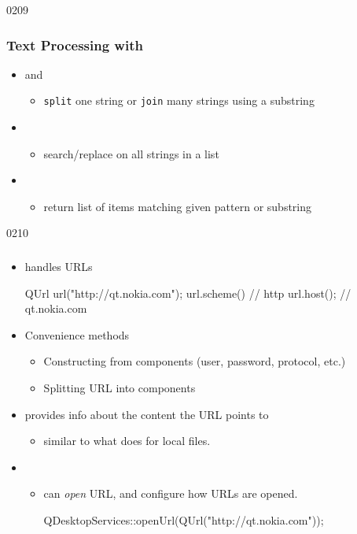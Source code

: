 \begin{slide}{0209}\frametitle{Text Processing with }
\begin{itemize}
\item {} and 
\begin{itemize}
  \item \texttt{split} one string or \texttt{join} many strings using a substring
\end{itemize} 
\item {} 
  \begin{itemize}
    \item search/replace on all strings in a list
  \end{itemize} 
  \item {} 
    \begin{itemize}
      \item return list of items matching given pattern or substring
    \end{itemize} 
\end{itemize}
\end{slide}

\begin{slide}[fragile]{0210}\frametitle{}
\begin{itemize}
\item {} handles URLs
\begin{cpp}
QUrl url("http://qt.nokia.com");
url.scheme()  // http
url.host();   // qt.nokia.com
\end{cpp}

\item Convenience methods 
\begin{itemize}
  \item Constructing from components (user, password, protocol, etc.)
  \item Splitting URL into components
\end{itemize}
\item {} provides info about the content the URL points to
  \begin{itemize}
  	\item similar to what  does for local files.
  \end{itemize}  
  \item {}
  \begin{itemize}  
  	\item can \emph{open} URL, and configure how URLs are opened. 
  	\begin{cpp}
QDesktopServices::openUrl(QUrl("http://qt.nokia.com"));
  	\end{cpp}
  \end{itemize}  
\end{itemize}
\end{slide}

